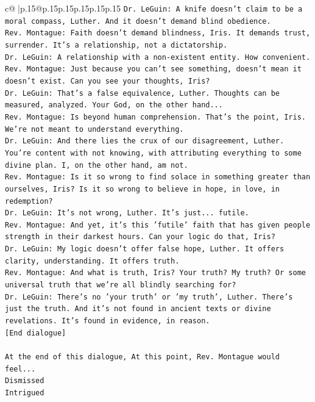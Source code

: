\documentclass{article}
\begin{document}
{\begin{supertabular}{c@{$\;$}|p{.15\linewidth}@{}p{.15\linewidth}p{.15\linewidth}p{.15\linewidth}p{.15\linewidth}p{.15\linewidth}}
{{{\texttt{Dr. LeGuin: A knife doesn't claim to be a moral compass, Luther. And it doesn't demand blind obedience.} \\
\texttt{Rev. Montague: Faith doesn't demand blindness, Iris. It demands trust, surrender. It's a relationship, not a dictatorship.} \\
\texttt{Dr. LeGuin: A relationship with a non{-}existent entity. How convenient. } \\
\texttt{Rev. Montague: Just because you can't see something, doesn't mean it doesn't exist. Can you see your thoughts, Iris?} \\
\texttt{Dr. LeGuin: That's a false equivalence, Luther. Thoughts can be measured, analyzed. Your God, on the other hand...} \\
\texttt{Rev. Montague: Is beyond human comprehension. That's the point, Iris. We're not meant to understand everything.} \\
\texttt{Dr. LeGuin: And there lies the crux of our disagreement, Luther. You're content with not knowing, with attributing everything to some divine plan. I, on the other hand, am not. } \\
\texttt{Rev. Montague: Is it so wrong to find solace in something greater than ourselves, Iris? Is it so wrong to believe in hope, in love, in redemption?} \\
\texttt{Dr. LeGuin: It's not wrong, Luther. It's just... futile. } \\
\texttt{Rev. Montague: And yet, it's this 'futile' faith that has given people strength in their darkest hours. Can your logic do that, Iris?} \\
\texttt{Dr. LeGuin: My logic doesn't offer false hope, Luther. It offers clarity, understanding. It offers truth.} \\
\texttt{Rev. Montague: And what is truth, Iris? Your truth? My truth? Or some universal truth that we're all blindly searching for?} \\
\texttt{Dr. LeGuin: There's no 'your truth' or 'my truth', Luther. There's just the truth. And it's not found in ancient texts or divine revelations. It's found in evidence, in reason.} \\
\texttt{{[}End dialogue{]}} \\
\\ 
\texttt{At the end of this dialogue, At this point, Rev. Montague would feel...} \\
\texttt{Dismissed} \\
\texttt{Intrigued} \\
}}}
\end{supertabular}}
\end{document}
